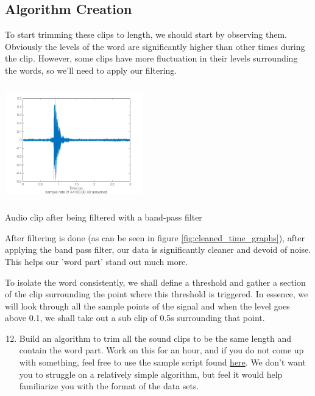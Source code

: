 \documentclass{tufte-handout}
\begin{document}
\subsection{Algorithm Creation}
To start trimming these clips to length, we should start by observing them. Obviously the levels of the word are significantly higher than other times during the clip. However, some clips have more fluctuation in their levels surrounding the words, so we'll need to apply our filtering.


\begin{marginfigure}
	\includegraphics[width = 6cm, height = 5cm]{cleaned_time_2.png}
	\caption{Audio clip after being filtered with a band-pass filter}
	\label{fig:cleaned_time_graphs}
\end{marginfigure}
After filtering is done (as can be seen in figure \ref{fig:cleaned_time_graphs}), after applying the band pass filter, our data is significantly cleaner and devoid of noise. This helps our 'word part' stand out much more.

To isolate the word consistently, we shall define a threshold and gather a section of the clip surrounding the point where this threshold is triggered. In essence, we will look through all the sample points of the signal and when the level goes above 0.1, we shall take out a sub clip of 0.5s surrounding that point. 

\begin{enumerate}
	\setcounter{enumi}{11}
	\item Build an algorithm to trim all the sound clips to be the same length and contain the word part. Work on this for an hour, and if you do not come up with something, feel free to use the sample script found \href{#}{here}. We don't want you to struggle on a relatively simple algorithm, but feel it would help familiarize you with the format of the data sets. 
\end{enumerate}
\end{document}
